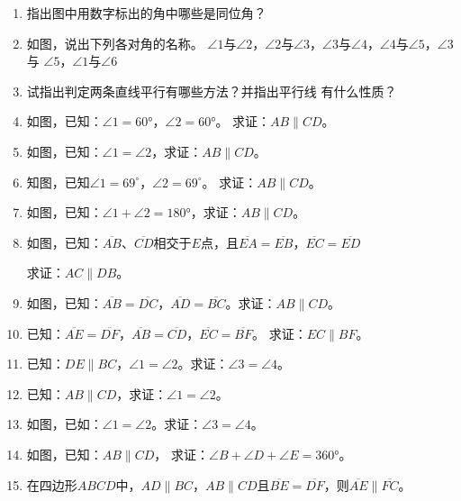 \begin{Practice}
\begin{enumerate}
    \item 指出图中用数字标出的角中哪些是同位角？
    \item 如图，说出下列各对角的名称。
    $\angle 1$与$\angle 2$，$\angle 2$与$\angle 3$，$\angle 3$与$\angle 4$，$\angle 4$与$\angle 5$，$\angle 3$与
    $\angle 5$，$\angle 1$与$\angle 6$
    \item 试指出判定两条直线平行有哪些方法？并指出平行线
    有什么性质？
    \item 如图，已知：$\angle 1=\ang{60}$，$\angle 2=\ang{60}$。
    求证：$AB\parallel CD$。

    \item 如图，已知：$\angle 1=\angle 2$，求证：$AB\parallel CD$。
    \item 知图，已知$\angle 1=69^{\circ}$，$\angle 2=69^{\circ}$。
    求证：$AB\parallel CD$。
    \item 如图，已知：$\angle 1+\angle 2=\ang{180}$，求证：$AB\parallel CD$。
    \item 如图，已知：$\overline{AB}$、$\overline{CD}$相交于$E$点，且$\overline{EA}=\overline{EB}$，$\overline{EC}=\overline{ED}$
    
求证：$AC\parallel DB$。

\item 如图，已知：$\overline{AB}=\overline{DC}$，$\overline{AD}=\overline{BC}$。求证：$AB\parallel CD$。
\item 已知：$\overline{AE}=\overline{DF}$，$\overline{AB}=\overline{CD}$，$\overline{EC}=\overline{BF}$。
求证：$EC\parallel BF$。
\item 已知：$DE\parallel BC$，$\angle 1=\angle 2$。求证：$\angle 3=\angle 4$。
\item 已知：$AB\parallel CD$，求证：$\angle 1=\angle 2$。
\item 如图，已如：$\angle 1=\angle 2$。求证：$\angle 3=\angle 4$。
\item 如图，已知：$AB\parallel CD$，
求证：$\angle B+\angle D+\angle E=3\ang{60}$。

\item 在四边形$ABCD$中，$AD\parallel BC$，$AB\parallel CD$且$\overline{BE}=\overline{DF}$，则$\overline{AE}\parallel \overline{FC}$。
\end{enumerate}
\end{Practice}

